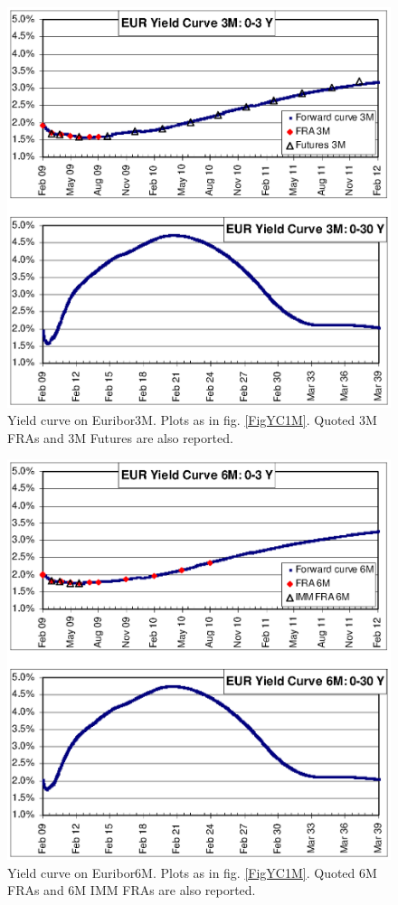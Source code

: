 \documentclass[11pt,reqno]{amsart}
\begin{document}
\begin{figure}[p]
\centering
\includegraphics[scale=1.0]{./FigYC3M}
\caption{Yield curve on Euribor3M. Plots as in fig. \protect\ref{FigYC1M}. Quoted 3M FRAs and 3M Futures are also reported.}
\label{FigYC3M}
\end{figure}
\newpage

\begin{figure}[p]
\centering
\includegraphics[scale=1.0]{./FigYC6M}
\caption{Yield curve on Euribor6M. Plots as in fig. \protect\ref{FigYC1M}. Quoted 6M FRAs and 6M IMM FRAs are also reported.}
\label{FigYC6M}
\end{figure}
\newpage
\end{document}
